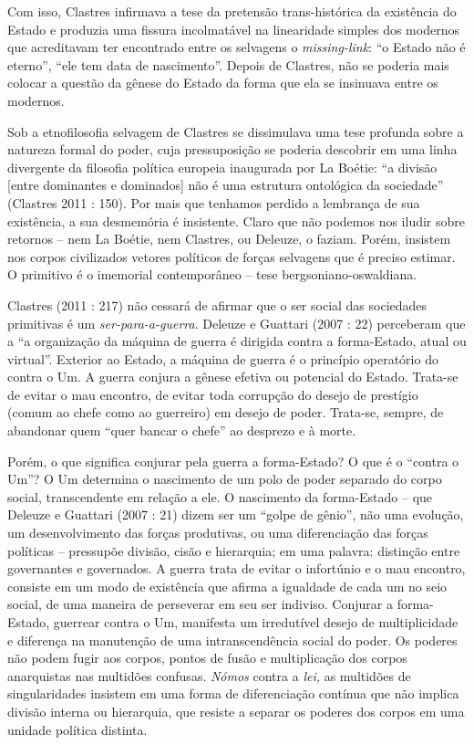 Com isso, Clastres infirmava a tese da pretensão trans-histórica da
existência do Estado e produzia uma fissura incolmatável na linearidade
simples dos modernos que acreditavam ter encontrado entre os selvagens o
\emph{missing-link}: ``o Estado não é eterno'', ``ele tem data de
nascimento''. Depois de Clastres, não se poderia mais colocar a questão
da gênese do Estado da forma que ela se insinuava entre os modernos.

Sob a etnofilosofia selvagem de Clastres se dissimulava uma tese
profunda sobre a natureza formal do poder, cuja pressuposição se poderia
descobrir em uma linha divergente da filosofia política europeia
inaugurada por La Boétie: ``a divisão {[}entre dominantes e dominados{]}
não é uma estrutura ontológica da sociedade'' (Clastres 2011 : 150). Por
mais que tenhamos perdido a lembrança de sua existência, a sua
desmemória é insistente. Claro que não podemos nos iludir sobre retornos
-- nem La Boétie, nem Clastres, ou Deleuze, o faziam. Porém, insistem
nos corpos civilizados vetores políticos de forças selvagens que é
preciso estimar. O primitivo é o imemorial contemporâneo -- tese
bergsoniano-oswaldiana.

Clastres (2011 : 217) não cessará de afirmar que o ser social das
sociedades primitivas é um \emph{ser-para-a-guerra}. Deleuze e Guattari
(2007 : 22) perceberam que a ``a organização da máquina de guerra é
dirigida contra a forma-Estado, atual ou virtual''. Exterior ao Estado,
a máquina de guerra é o princípio operatório do contra o Um. A guerra
conjura a gênese efetiva ou potencial do Estado. Trata-se de evitar o
mau encontro, de evitar toda corrupção do desejo de prestígio (comum ao
chefe como ao guerreiro) em desejo de poder. Trata-se, sempre, de
abandonar quem ``quer bancar o chefe'' ao desprezo e à morte.

Porém, o que significa conjurar pela guerra a forma-Estado? O que é o
``contra o Um''? O Um determina o nascimento de um polo de poder
separado do corpo social, transcendente em relação a ele. O nascimento
da forma-Estado -- que Deleuze e Guattari (2007 : 21) dizem ser um
``golpe de gênio'', não uma evolução, um desenvolvimento das forças
produtivas, ou uma diferenciação das forças políticas -- pressupõe
divisão, cisão e hierarquia; em uma palavra: distinção entre governantes
e governados. A guerra trata de evitar o infortúnio e o mau encontro,
consiste em um modo de existência que afirma a igualdade de cada um no
seio social, de uma maneira de perseverar em seu ser indiviso. Conjurar
a forma-Estado, guerrear contra o Um, manifesta um irredutível desejo de
multiplicidade e diferença na manutenção de uma intranscendência social
do poder. Os poderes não podem fugir aos corpos, pontos de fusão e
multiplicação dos corpos anarquistas nas multidões confusas. \emph{Nómos
}contra a \emph{lei, }as multidões de singularidades insistem em uma
forma de diferenciação contínua que não implica divisão interna ou
hierarquia, que resiste a separar os poderes dos corpos em uma unidade
política distinta.

